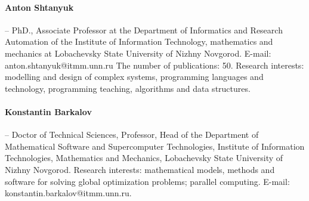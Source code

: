 \documentclass[a4paper,12pt,russian]{article}
\begin{document}
\paragraph{Anton Shtanyuk} -- PhD., Associate Professor at the Department of Informatics and Research Automation of the Institute of Information Technology, mathematics and mechanics at Lobachevsky State University of Nizhny Novgorod. E-mail: anton.shtanyuk@itmm.unn.ru The number of publications: 50. Research interests: modelling and design of complex systems, programming languages and technology, programming teaching, algorithms and data structures.
\paragraph{Konstantin Barkalov} -- Doctor of Technical Sciences, Professor, Head of the Department of Mathematical Software and Supercomputer Technologies, Institute of Information Technologies, Mathematics and Mechanics, Lobachevsky State University of Nizhny Novgorod. Research interests: mathematical models, methods and software for solving global optimization problems; parallel computing. E-mail: konstantin.barkalov@itmm.unn.ru.
\end{document}
